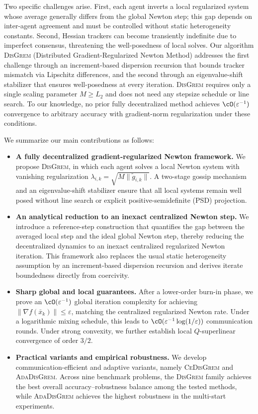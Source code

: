 \documentclass[review,onefignum,onetabnum]{siamart171218}
\begin{document}
	Two specific challenges arise.
	First, each agent inverts a local regularized system whose
	average generally differs from the global Newton step; this gap
	depends on inter-agent agreement and must be controlled without
	static heterogeneity constants.
	Second, Hessian trackers can become transiently indefinite due to
	imperfect consensus, threatening the well-posedness of local solves.
	Our algorithm \textsc{DisGrem} (Distributed Gradient-Regularized
	Newton Method) addresses the first challenge through an increment-based
	dispersion recursion that bounds tracker mismatch via Lipschitz
	differences, and the second through an eigenvalue-shift
	stabilizer that ensures well-posedness at every iteration.
	\textsc{DisGrem} requires only a single scaling parameter $M\ge L_2$
	and does not need any stepsize schedule or line search.
	To our knowledge, no prior fully decentralized method achieves
	$\cO(\varepsilon^{-1})$ convergence to arbitrary accuracy
	with gradient-norm regularization under these conditions.
	
	We summarize our main contributions as follows:
	\begin{itemize}[leftmargin=1.5em]
		\item \textbf{A fully decentralized gradient-regularized Newton framework.}
		We propose \textsc{DisGrem}, in which each agent solves a local Newton system
		with vanishing regularization $\lambda_{i,k}=\sqrt{M\|\tilde g_{i,k}\|}$.
		A two-stage gossip mechanism and an eigenvalue-shift stabilizer ensure that
		all local systems remain well posed without line search or explicit positive-semidefinite (PSD) projection.
		
		\item \textbf{An analytical reduction to an inexact centralized Newton step.}
		We introduce a reference-step construction that quantifies the gap between the
		averaged local step and the ideal global Newton step, thereby reducing the
		decentralized dynamics to an inexact centralized regularized Newton iteration.
		This framework also replaces the usual static heterogeneity assumption by an
		increment-based dispersion recursion and derives iterate boundedness directly
		from coercivity.
		
		\item \textbf{Sharp global and local guarantees.}
		After a lower-order burn-in phase, we prove an $\cO(\varepsilon^{-1})$ global
		iteration complexity for achieving $\|\nabla f(\bar x_k)\|\le\varepsilon$,
		matching the centralized regularized Newton rate. Under a logarithmic
		mixing schedule, this leads to $\cO(\varepsilon^{-1}\log(1/\varepsilon))$
		communication rounds.
		Under strong convexity, we further establish local $Q$-superlinear convergence
		of order $3/2$.
		
		\item \textbf{Practical variants and empirical robustness.}
		We develop communication-efficient and adaptive variants, namely
		\textsc{CeDisGrem} and \textsc{AdaDisGrem}. Across nine benchmark problems,
		the \textsc{DisGrem} family achieves the best overall accuracy--robustness
		balance among the tested methods, while \textsc{AdaDisGrem} achieves the
		highest robustness in the multi-start experiments.
	\end{itemize}
	
\end{document}

